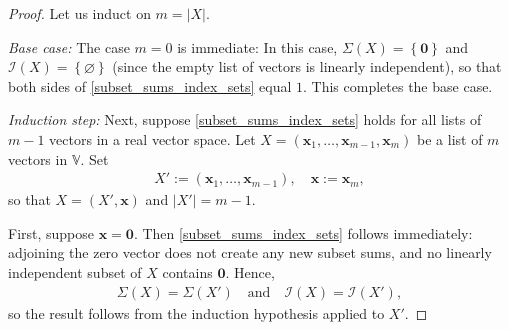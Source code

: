 \documentclass[10pt,a4paper]{amsart}
\newcommand{\VV}{\mathbb{V}} %
\newcommand{\abs}[1]{\left| #1 \right|}
\renewcommand{\emptyset}{\varnothing} %
\newcommand{\set}[1]{\left\{ #1 \right\}}
\newcommand{\tup}[1]{\left( #1 \right)}
\begin{document}
\begin{proof}
    Let us induct on $m=\abs{X}$.
    \medskip
    
    \textit{Base case:} The case $m=0$ is immediate: In this case, $\Sigma(X) = \set{\mathbf{0}}$ and $\mathcal{I}\tup{X} = \set{\emptyset}$ (since the empty list of vectors is linearly independent), so that both sides of \eqref{subset_sums_index_sets} equal $1$. This completes the base case.


    \medskip
    \textit{Induction step:} Next, suppose \eqref{subset_sums_index_sets} holds for all lists of $m-1$ vectors in a real vector space. Let $X = \tup{\mathbf{x}_1,\ldots,\mathbf{x}_{m-1},\mathbf{x}_m}$ be a list of $m$ vectors in $\VV$. Set \begin{align*}
        X' := \tup{\mathbf{x}_1,\ldots,\mathbf{x}_{m-1}}, \quad \mathbf{x} := \mathbf{x}_m,
    \end{align*} so that $X = \tup{X',\mathbf{x}}$ and $|X'|=m-1$.

    First, suppose $\mathbf{x} = \mathbf{0}$. Then \eqref{subset_sums_index_sets} follows immediately: adjoining the zero vector does not create any new subset sums, and no linearly independent subset of $X$ contains $\mathbf{0}$. Hence, \begin{align*}
        \Sigma(X) = \Sigma(X') \quad \text{and} \quad \mathcal{I}(X) = \mathcal{I}(X'),
    \end{align*} so the result follows from the induction hypothesis applied to $X'$.


\end{proof}
\end{document}
